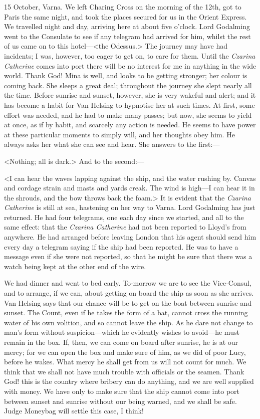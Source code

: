 \begin{diary}{15 October, Varna.}
We left Charing Cross on the morning of the 12th, got to Paris the same night, and took the places secured for us in the Orient Express. We travelled night and day, arriving here at about five o'clock. Lord Godalming went to the Consulate to see if any telegram had arrived for him, whilst the rest of us came on to this hotel—<the Odessus.> The journey may have had incidents; I was, however, too eager to get on, to care for them. Until the \textit{Czarina Catherine} comes into port there will be no interest for me in anything in the wide world. Thank God! Mina is well, and looks to be getting stronger; her colour is coming back. She sleeps a great deal; throughout the journey she slept nearly all the time. Before sunrise and sunset, however, she is very wakeful and alert; and it has become a habit for Van Helsing to hypnotise her at such times. At first, some effort was needed, and he had to make many passes; but now, she seems to yield at once, as if by habit, and scarcely any action is needed. He seems to have power at these particular moments to simply will, and her thoughts obey him. He always asks her what she can see and hear. She answers to the first:—

<Nothing; all is dark.> And to the second:—

<I can hear the waves lapping against the ship, and the water rushing by. Canvas and cordage strain and masts and yards creak. The wind is high—I can hear it in the shrouds, and the bow throws back the foam.> It is evident that the \textit{Czarina Catherine} is still at sea, hastening on her way to Varna. Lord Godalming has just returned. He had four telegrams, one each day since we started, and all to the same effect: that the \textit{Czarina Catherine} had not been reported to Lloyd's from anywhere. He had arranged before leaving London that his agent should send him every day a telegram saying if the ship had been reported. He was to have a message even if she were not reported, so that he might be sure that there was a watch being kept at the other end of the wire.

We had dinner and went to bed early. To-morrow we are to see the Vice-Consul, and to arrange, if we can, about getting on board the ship as soon as she arrives. Van Helsing says that our chance will be to get on the boat between sunrise and sunset. The Count, even if he takes the form of a bat, cannot cross the running water of his own volition, and so cannot leave the ship. As he dare not change to man's form without suspicion—which he evidently wishes to avoid—he must remain in the box. If, then, we can come on board after sunrise, he is at our mercy; for we can open the box and make sure of him, as we did of poor Lucy, before he wakes. What mercy he shall get from us will not count for much. We think that we shall not have much trouble with officials or the seamen. Thank God! this is the country where bribery can do anything, and we are well supplied with money. We have only to make sure that the ship cannot come into port between sunset and sunrise without our being warned, and we shall be safe. Judge Moneybag will settle this case, I think!
\end{diary}
 

